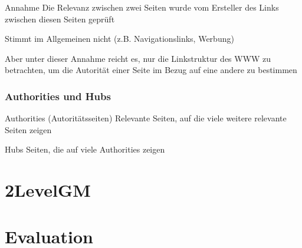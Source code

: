 \documentclass[hyperref={pdfpagelabels=false}]{beamer}
\begin{document}
\begin{frame}[allowframebreaks]

\begin{block}{Annahme}
Die Relevanz zwischen zwei Seiten wurde vom Ersteller des Links zwischen diesen Seiten geprüft
\end{block}

Stimmt im Allgemeinen nicht (z.B. Navigationslinks, Werbung)
\vspace{10pt}

Aber unter dieser Annahme reicht es, nur die Linkstruktur des WWW zu betrachten, um die Autorität einer Seite im Bezug auf eine andere zu bestimmen

\frametitle{Authorities und Hubs}

\framebreak

\begin{block}{Authorities (Autoritätsseiten)}
Relevante Seiten, auf die viele weitere relevante Seiten zeigen
\end{block}


\begin{block}{Hubs}
Seiten, die auf viele Authorities zeigen
\end{block}

\end{frame}
\section{2LevelGM} 


\section{Evaluation} 

\end{document}
